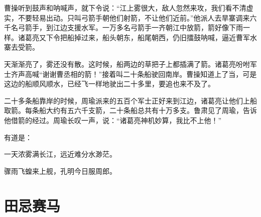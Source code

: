 \documentclass[12pt,UTF-8,openany]{ctexbook}
\begin{document}
\begin{large}
    曹操听到鼓声和呐喊声，就下令说：“江上雾很大，敌人忽然来攻，我们看不清虚实，不要轻易出动。只叫弓箭手朝他们射箭，不让他们近前。”他派人去旱寨调来六千名弓箭手，到江边支援水军。一万多名弓箭手一齐朝江中放箭，箭好像下雨一样。诸葛亮又下令把船掉过来，船头朝东，船尾朝西，仍旧擂鼓呐喊，逼近曹军水寨去受箭。
    
    天渐渐亮了，雾还没有散。这时候，船两边的草把子上都插满了箭。诸葛亮吩咐军士齐声高喊“谢谢曹丞相的箭！”接着叫二十条船驶回南岸。曹操知道上了当，可是这边的船顺风顺水，已经飞一样地驶出二十多里，要追也来不及了。
    
    二十多条船靠岸的时候，周瑜派来的五百个军士正好来到江边，诸葛亮让他们上船取箭。每条船大约有五六千支箭，二十条船总共有十万多支。鲁肃见了周瑜，告诉他借箭的经过。周瑜长叹一声，说：“诸葛亮神机妙算，我比不上他！”
    
    有道是：
    
    一天浓雾满长江，远近难分水渺茫。
    
    骤雨飞蝗来上舰，孔明今日服周郎。
    
\end{large}



\chapter{田忌赛马}
\end{document}
